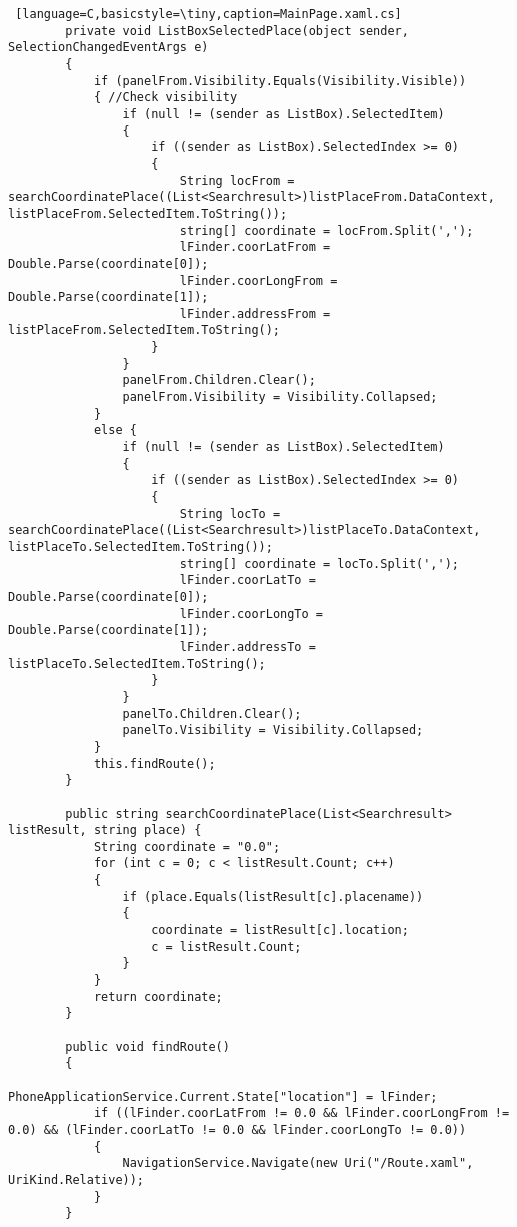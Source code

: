 \begin{lstlisting} [language=C,basicstyle=\tiny,caption=MainPage.xaml.cs]
        private void ListBoxSelectedPlace(object sender, SelectionChangedEventArgs e)
        {
            if (panelFrom.Visibility.Equals(Visibility.Visible))
            { //Check visibility
                if (null != (sender as ListBox).SelectedItem)
                {
                    if ((sender as ListBox).SelectedIndex >= 0)
                    {
                        String locFrom = searchCoordinatePlace((List<Searchresult>)listPlaceFrom.DataContext, listPlaceFrom.SelectedItem.ToString()); 
                        string[] coordinate = locFrom.Split(',');
                        lFinder.coorLatFrom = Double.Parse(coordinate[0]);
                        lFinder.coorLongFrom = Double.Parse(coordinate[1]);
                        lFinder.addressFrom = listPlaceFrom.SelectedItem.ToString();
                    }
                }
                panelFrom.Children.Clear();
                panelFrom.Visibility = Visibility.Collapsed;
            }
            else {
                if (null != (sender as ListBox).SelectedItem)
                {
                    if ((sender as ListBox).SelectedIndex >= 0)
                    {
                        String locTo = searchCoordinatePlace((List<Searchresult>)listPlaceTo.DataContext, listPlaceTo.SelectedItem.ToString()); 
                        string[] coordinate = locTo.Split(',');
                        lFinder.coorLatTo = Double.Parse(coordinate[0]);
                        lFinder.coorLongTo = Double.Parse(coordinate[1]);
                        lFinder.addressTo = listPlaceTo.SelectedItem.ToString();
                    }
                }
                panelTo.Children.Clear();
                panelTo.Visibility = Visibility.Collapsed;
            }
            this.findRoute();
        }

        public string searchCoordinatePlace(List<Searchresult> listResult, string place) { 
            String coordinate = "0.0";
            for (int c = 0; c < listResult.Count; c++)
            {
                if (place.Equals(listResult[c].placename))
                {
                    coordinate = listResult[c].location;
                    c = listResult.Count;
                }
            }
            return coordinate;
        }

        public void findRoute()
        {
						PhoneApplicationService.Current.State["location"] = lFinder;
            if ((lFinder.coorLatFrom != 0.0 && lFinder.coorLongFrom != 0.0) && (lFinder.coorLatTo != 0.0 && lFinder.coorLongTo != 0.0))
            {
                NavigationService.Navigate(new Uri("/Route.xaml", UriKind.Relative)); 
            }
        }


\end{lstlisting}
